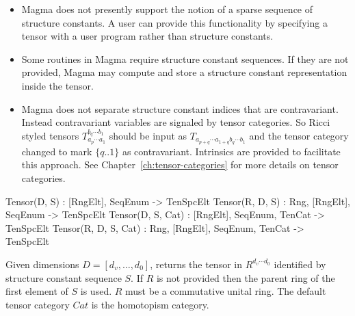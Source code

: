 \begin{itemize}
\item Magma does not presently support the notion of a sparse sequence of structure constants.
A user can provide this functionality by specifying a tensor with a user program rather
than structure constants. 

\item Some routines in Magma require structure constant sequences.  If they 
are not provided, Magma may compute and store a structure constant representation
inside the tensor.

\item Magma does not separate structure constant indices that are contravariant.  Instead contravariant variables are signaled by tensor categories.  So Ricci styled tensors $T_{a_p\cdots a_1}^{b_q\cdots b_1}$ should be input as $T_{a_{p+q}\cdots a_{1+q} b_q\cdots b_1}$ and the tensor
category changed to mark $\{q..1\}$ as contravariant. Intrinsics are provided to facilitate this approach.
See Chapter~\ref{ch:tensor-categories} for more details on tensor categories.
\end{itemize}
\medskip

\begin{intrinsics}
Tensor(D, S) : [RngElt], SeqEnum -> TenSpcElt
Tensor(R, D, S) : Rng, [RngElt], SeqEnum -> TenSpcElt
Tensor(D, S, Cat) : [RngElt], SeqEnum, TenCat -> TenSpcElt
Tensor(R, D, S, Cat) : Rng, [RngElt], SeqEnum, TenCat -> TenSpcElt
\end{intrinsics}

Given dimensions $D=[d_v,\dots,d_0]$, returns the tensor
in $R^{d_v\cdots d_0}$ identified by structure constant sequence $S$.
If $R$ is not provided then the parent ring of the first element of $S$ is used.  
$R$ must be a commutative unital ring.
The default tensor category $Cat$ is the homotopism category.


